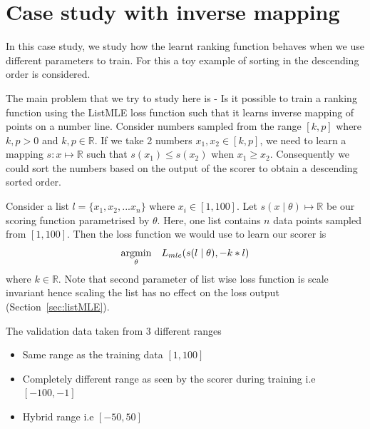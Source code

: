 \documentclass[12pt, twoside, ngerman]{report}
\begin{document}
\section{Case study with inverse mapping}

In this case study,  we study how the learnt ranking function behaves when we use different parameters to train.
For this a toy example of sorting in the descending order is considered.
    
The main problem that we try to study here is - Is it possible to train a ranking function using the ListMLE loss function such that it learns inverse mapping of points on a number line.
Consider numbers sampled from the range $[k,  p]$ where $k,p > 0$ and  $k,p \in \mathbb{R}$.
If we take 2 numbers $x_1, x_2 \in [k,  p]$,  we need to learn a mapping $s: x \mapsto \mathbb{R}$ such that $s(x_1) \leq s(x_2)$ when $x_1 \geq x_2$.
Consequently we could sort the numbers based on the output of the scorer to obtain a descending sorted order.

Consider a list $l = \{x_1, x_2, ...x_n\}$ where $x_i \in [1, 100]$.
Let $s(x \mid \theta) \mapsto \mathbb{R}$ be our scoring function parametrised by $\theta$.
Here, one list contains $n$ data points sampled from $[1, 100]$.
Then the loss function we would use to learn our scorer is
\begin{equation}
\underset{\theta}{\rm argmin} \quad L_{mle}(s(l \mid \theta),  - k * l)
\end{equation}
where $k \in \mathbb{R}$.
Note that second parameter of list wise loss function is scale invariant hence scaling the list has no effect on the loss output (Section~\ref{sec:listMLE}).


The validation data taken from 3 different ranges
\begin{itemize}
\item Same range as the training data $[1, 100]$
\item Completely different range as seen by the scorer during training i.e $[-100, -1]$
\item Hybrid range i.e $[-50, 50]$
\end{itemize} 
\end{document}

